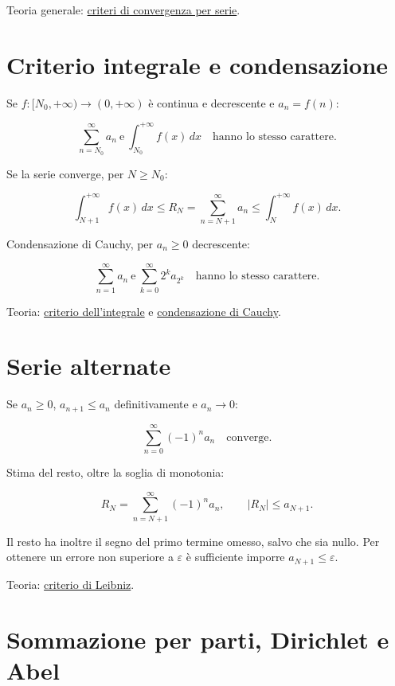 Teoria generale: \href{https://ingegnerismo.it/matematica/criteri-convergenza-serie/}{criteri di convergenza per serie}.

\section{Criterio integrale e condensazione}\label{criterio-integrale-e-condensazione}

Se \(f:[N_0,+\infty)\to(0,+\infty)\) è continua e decrescente e \(a_n=f(n)\):

\[
\displaystyle
\sum_{n=N_0}^{\infty}a_n
\ \text{e}\
\int_{N_0}^{+\infty}f(x)\,dx
\quad
\text{hanno lo stesso carattere}.
\]

Se la serie converge, per \(N\ge N_0\):

\[
\displaystyle
\int_{N+1}^{+\infty}f(x)\,dx
\le
R_N
=
\sum_{n=N+1}^{\infty}a_n
\le
\int_N^{+\infty}f(x)\,dx.
\]

Condensazione di Cauchy, per \(a_n\ge0\) decrescente:

\[
\displaystyle
\sum_{n=1}^{\infty}a_n
\ \text{e}\
\sum_{k=0}^{\infty}2^k a_{2^k}
\quad
\text{hanno lo stesso carattere}.
\]

Teoria: \href{https://ingegnerismo.it/matematica/criterio-dell-integrale/}{criterio dell'integrale} e \href{https://ingegnerismo.it/matematica/criterio-di-condensazione-di-cauchy/}{condensazione di Cauchy}.

\section{Serie alternate}\label{serie-alternate}

Se \(a_n\ge0\), \(a_{n+1}\le a_n\) definitivamente e \(a_n\to0\):

\[
\displaystyle
\sum_{n=0}^{\infty}(-1)^n a_n
\quad\text{converge}.
\]

Stima del resto, oltre la soglia di monotonia:

\[
\displaystyle
R_N
=
\sum_{n=N+1}^{\infty}(-1)^n a_n,
\qquad
\lvert R_N\rvert\le a_{N+1}.
\]

Il resto ha inoltre il segno del primo termine omesso, salvo che sia nullo. Per ottenere un errore non superiore a \(\varepsilon\) è sufficiente imporre \(a_{N+1}\le\varepsilon\).

Teoria: \href{https://ingegnerismo.it/matematica/criterio-di-leibniz/}{criterio di Leibniz}.

\section{Sommazione per parti, Dirichlet e Abel}\label{sommazione-per-parti-dirichlet-e-abel}

